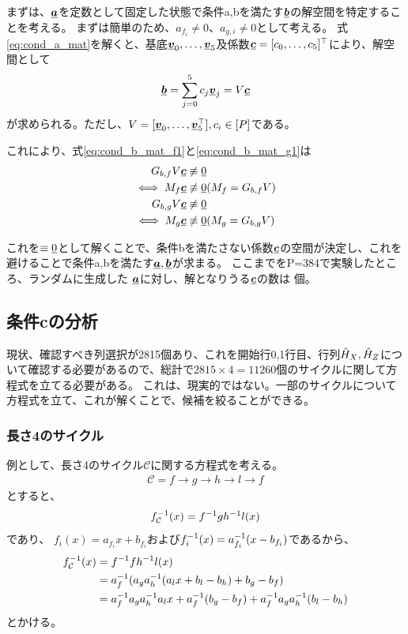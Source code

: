 \documentclass[a4paper,11pt,dvipdfmx]{jsarticle}
\theoremstyle{definition}
\begin{document}
まずは、$\underline{\bm{a}}$を定数として固定した状態で条件a,bを満たす$\underline{\bm{b}}$の解空間を特定することを考える。
まずは簡単のため、$a_{f_i}\neq 0$、$a_{g,i}\neq 0$として考える。
式\eqref{eq:cond_a_mat}を解くと、基底$\underline{\bm{v}}_0,\dots,\underline{\bm{v}}_5$及係数$\underline{\bm{c}}=[c_0,\dots,c_5]^\top$により、解空間として
\begin{align}
  \underline{\bm{b}} = \sum_{j=0}^5 c_j \underline{\bm{v}}_j = V\underline{\bm{c}}
\end{align}
が求められる。ただし、$V=[\underline{\bm{v}}_0,\dots,\underline{\bm{v}}_5^\top],c_i\in[P]$である。

これにより、式\eqref{eq:cond_b_mat_f1}と\eqref{eq:cond_b_mat_g1}は
\begin{align}
  G_{b,f}V\underline{\bm{c}} &\not\equiv \underline{0}\label{eq:cond_b_mat_f2}\\
  \iff M_f\underline{\bm{c}} &\not\equiv \underline{0}\label{eq:cond_b_mat_f3}
  (M_f = G_{b,f}V)\\
  G_{b,g}V\underline{\bm{c}} &\not\equiv \underline{0}\label{eq:cond_b_mat_g2}\\
  \iff M_g\underline{\bm{c}} &\not\equiv \underline{0}\label{eq:cond_b_mat_g3}
  (M_g = G_{b,g}V)\\
\end{align}



これを$\equiv \underline{0}$として解くことで、条件bを満たさない係数$\underline{\bm{c}}$の空間が決定し、これを避けることで条件a,bを満たす$\underline{\bm{a}},\underline{\bm{b}}$が求まる。
ここまでをP=384で実験したところ、ランダムに生成した $\underline{\bm{a}}$に対し、解となりうる$\underline{\bm{c}}$の数は 個。

\subsection{条件cの分析}
現状、確認すべき列選択が2815個あり、これを開始行0,1行目、行列$\hat{H}_X,\hat{H}_Z$について確認する必要があるので、総計で$2815\times4 = 11260$個のサイクルに関して方程式を立てる必要がある。
これは、現実的ではない。一部のサイクルについて方程式を立て、これが解くことで、候補を絞ることができる。
\subsubsection{長さ4のサイクル}
例として、長さ4のサイクル$\mathcal{C}$に関する方程式を考える。
\begin{align}
  \mathcal{C} = f\rightarrow g\rightarrow h\rightarrow l\rightarrow f
\end{align}
とすると、
\begin{align}
  f_{\mathcal{C}}^{-1}(x) = 
  f^{-1} g h^{-1} l(x)
\end{align}
であり、
$f_i(x) = a_{f_i}x + b_{f_i}$および$f_i^{-1}(x) = a_{f_i}^{-1}(x - b_{f_i})$であるから、
 \begin{align}
    f_{\mathcal{C}}^{-1}(x) &= f^{-1} f h^{-1} l(x)\\
    &= a_f^{-1}(a_g a_h^{-1}(a_l x + b_l - b_h) + b_g - b_f)\\
    &= a_f^{-1} a_g a_h^{-1} a_l x + a_f^{-1}(b_g - b_f) + a_f^{-1} a_g a_h^{-1} (b_l - b_h)\\
\end{align}
とかける。
\end{document}
